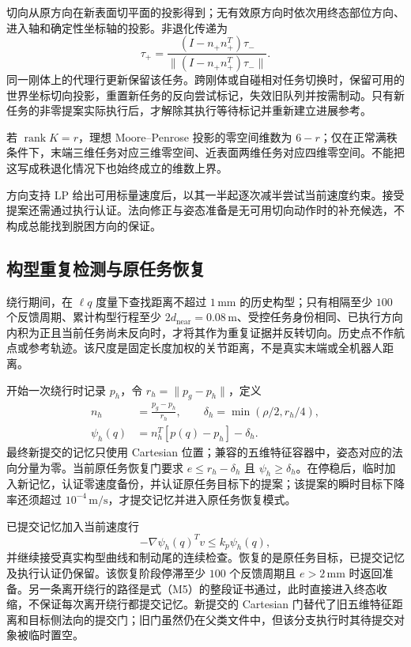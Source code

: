 切向从原方向在新表面切平面的投影得到；无有效原方向时依次用终态部位方向、进入轴和确定性坐标轴的投影。非退化传递为
\begin{equation}
 \tau_{+}=\frac{(I-n_+n_+^T)\tau_-}{\|(I-n_+n_+^T)\tau_-\|}.\tag{M12}
\end{equation}
同一刚体上的代理行更新保留该任务。跨刚体或自碰相对任务切换时，保留可用的世界坐标切向投影，重置新任务的反向尝试标记，失效旧队列并按需制动。只有新任务的非零提案实际执行后，才解除其执行等待标记并重新建立进展参考。

若 $\operatorname{rank}K=r$，理想 Moore--Penrose 投影的零空间维数为 $6-r$；仅在正常满秩条件下，末端三维任务对应三维零空间、近表面两维任务对应四维零空间。不能把这写成秩退化情况下也始终成立的维数上界。

方向支持 LP 给出可用标量速度后，以其一半起逐次减半尝试当前速度约束。接受提案还需通过执行认证。法向修正与姿态准备是无可用切向动作时的补充候选，不构成总能找到脱困方向的保证。

\subsection{构型重复检测与原任务恢复}
绕行期间，在 $\ell q$ 度量下查找距离不超过 $1\,\mathrm{mm}$ 的历史构型；只有相隔至少 $100$ 个反馈周期、累计构型行程至少 $2d_{\mathrm{near}}=0.08\,\mathrm m$、受控任务身份相同、已执行方向内积为正且当前任务尚未反向时，才将其作为重复证据并反转切向。历史点不作航点或参考轨迹。该尺度是固定长度加权的关节距离，不是真实末端或全机器人距离。

开始一次绕行时记录 $p_h$，令 $r_h=\|p_g-p_h\|$，定义
\begin{equation}
\begin{aligned}
 n_h&=\frac{p_g-p_h}{r_h},\qquad \delta_h=\min(\rho/2,r_h/4),\\
 \psi_h(q)&=n_h^T[p(q)-p_h]-\delta_h.
\end{aligned}\tag{M13}
\end{equation}
最终新提交的记忆只使用 Cartesian 位置；兼容的五维特征容器中，姿态对应的法向分量为零。当前原任务恢复门要求 $e\le r_h-\delta_h$ 且 $\psi_h\ge\delta_h$。在停稳后，临时加入新记忆，认证零速度备份，并认证原任务目标下的提案；该提案的瞬时目标下降率还须超过 $10^{-4}\,\mathrm{m/s}$，才提交记忆并进入原任务恢复模式。

已提交记忆加入当前速度行
\begin{equation}
 -\nabla\psi_h(q)^Tv\le k_p\psi_h(q),\tag{M14}
\end{equation}
并继续接受真实构型曲线和制动尾的连续检查。恢复的是原任务目标，已提交记忆及执行认证仍保留。该恢复阶段停滞至少 $100$ 个反馈周期且 $e>2\,\mathrm{mm}$ 时返回准备。另一条离开绕行的路径是式（M5）的整段证书通过，此时直接进入终态收缩，不保证每次离开绕行都提交记忆。新提交的 Cartesian 门替代了旧五维特征距离和目标侧法向的提交门；旧门虽然仍在父类文件中，但该分支执行时其待提交对象被临时置空。

